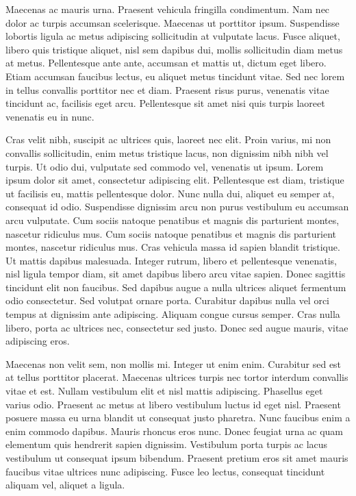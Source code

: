 \documentclass[botnum,fleqn,final]{unmeethesis}
\begin{document}
Maecenas ac mauris urna. Praesent vehicula fringilla condimentum. Nam nec dolor
ac turpis accumsan scelerisque. Maecenas ut porttitor ipsum. Suspendisse
lobortis ligula ac metus adipiscing sollicitudin at vulputate lacus. Fusce
aliquet, libero quis tristique aliquet, nisl sem dapibus dui, mollis
sollicitudin diam metus at metus. Pellentesque ante ante, accumsan et mattis
ut, dictum eget libero. Etiam accumsan faucibus lectus, eu aliquet metus
tincidunt vitae. Sed nec lorem in tellus convallis porttitor nec et diam.
Praesent risus purus, venenatis vitae tincidunt ac, facilisis eget arcu.
Pellentesque sit amet nisi quis turpis laoreet venenatis eu in nunc.

Cras velit nibh, suscipit ac ultrices quis, laoreet nec elit. Proin varius, mi
non convallis sollicitudin, enim metus tristique lacus, non dignissim nibh nibh
vel turpis. Ut odio dui, vulputate sed commodo vel, venenatis ut ipsum. Lorem
ipsum dolor sit amet, consectetur adipiscing elit. Pellentesque est diam,
tristique ut facilisis eu, mattis pellentesque dolor. Nunc nulla dui, aliquet
eu semper at, consequat id odio. Suspendisse dignissim arcu non purus
vestibulum eu accumsan arcu vulputate. Cum sociis natoque penatibus et magnis
dis parturient montes, nascetur ridiculus mus. Cum sociis natoque penatibus et
magnis dis parturient montes, nascetur ridiculus mus. Cras vehicula massa id
sapien blandit tristique. Ut mattis dapibus malesuada. Integer rutrum, libero
et pellentesque venenatis, nisl ligula tempor diam, sit amet dapibus libero
arcu vitae sapien. Donec sagittis tincidunt elit non faucibus. Sed dapibus
augue a nulla ultrices aliquet fermentum odio consectetur. Sed volutpat ornare
porta. Curabitur dapibus nulla vel orci tempus at dignissim ante adipiscing.
Aliquam congue cursus semper. Cras nulla libero, porta ac ultrices nec,
consectetur sed justo. Donec sed augue mauris, vitae adipiscing eros.

Maecenas non velit sem, non mollis mi. Integer ut enim enim. Curabitur sed est
at tellus porttitor placerat. Maecenas ultrices turpis nec tortor interdum
convallis vitae et est. Nullam vestibulum elit et nisl mattis adipiscing.
Phasellus eget varius odio. Praesent ac metus at libero vestibulum luctus id
eget nisl. Praesent posuere massa eu urna blandit ut consequat justo pharetra.
Nunc faucibus enim a enim commodo dapibus. Mauris rhoncus eros nunc. Donec
feugiat urna ac quam elementum quis hendrerit sapien dignissim. Vestibulum
porta turpis ac lacus vestibulum ut consequat ipsum bibendum. Praesent pretium
eros sit amet mauris faucibus vitae ultrices nunc adipiscing. Fusce leo lectus,
consequat tincidunt aliquam vel, aliquet a ligula.
\end{document}
